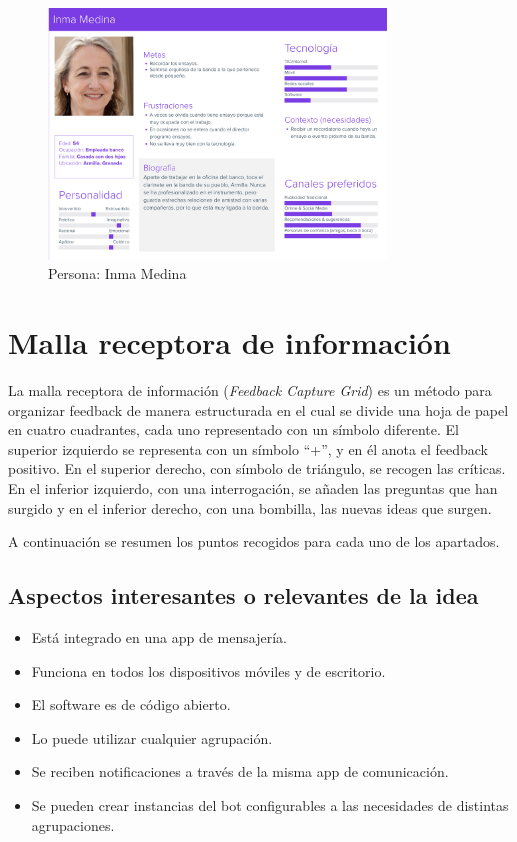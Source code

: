 \begin{figure}[h]
\centering
\includegraphics[width=0.8\textwidth]{imagenes/personas/persona_inma.png}
\caption{Persona: Inma Medina}
\label{fig:persona_inma}
\end{figure}

\section{Malla receptora de información}

La malla receptora de información (\textit{Feedback Capture Grid}) es un método para organizar feedback de manera estructurada en el cual se divide una hoja de papel en cuatro cuadrantes, cada uno representado con un símbolo diferente. El superior izquierdo se representa con un símbolo ``+'', y en él anota el feedback positivo. En el superior derecho, con símbolo de triángulo, se recogen las críticas. En el inferior izquierdo, con una interrogación, se añaden las preguntas que han surgido y en el inferior derecho, con una bombilla, las nuevas ideas que surgen.\cite{feedbackCaptureGrid}

A continuación se resumen los puntos recogidos para cada uno de los apartados.

\subsection{Aspectos interesantes o relevantes de la idea}

\begin{itemize}
    \item Está integrado en una app de mensajería.
    \item Funciona en todos los dispositivos móviles y de escritorio.
    \item El software es de código abierto.
    \item Lo puede utilizar cualquier agrupación.
    \item Se reciben notificaciones a través de la misma app de comunicación.
    \item Se pueden crear instancias del bot configurables a las necesidades de distintas agrupaciones.
\end{itemize}

